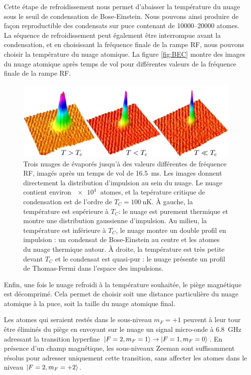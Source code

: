 Cette étape de refroidissement nous permet d'abaisser la température du nuage sous le seuil de condensation de Bose-Einstein.
Nous pouvons ainsi produire de façon reproductible des condensats sur puce contenant de \SIrange{10000}{20000}{} atomes.
La séquence de refroidissement peut également être interrompue avant la condensation, et en choisissant la fréquence finale de la rampe RF, nous pouvons choisir la température du nuage atomique.
La figure \eqref{fig:BEC} montre des images du nuage atomique après temps de vol pour différentes valeurs de la fréquence finale de la rampe RF.
%
\begin{figure}[!h]
\centering
\includegraphics[width=.8\linewidth]{figures/setup/coldatoms/BEC}
\caption[Condensat de Bose-Einstein sur puce]{
Trois nuages de  évaporés jusqu'à des valeurs différentes de fréquence RF, imagés après un temps de vol de \SI{16.5}{\ms}.
Les images donnent directement la distribution d'impulsion au sein du nuage.
Le nuage contient environ $\SI{e4}{}$ atomes, et la tepérature critique de condensation est de l'ordre de $T_C = \SI{100}{\nano\K}$.
\`A gauche, la température est supérieure à $T_C$: le nuage est purement thermique et montre une distribution gaussienne d'impulsion.
Au milieu, la température est inférieure à $T_C$, le nuage montre un double profil en impulsion : un condensat de Bose-Einstein au centre et les atomes du nuage thermique autour.
\`A droite, la température est très petite devant $T_C$ et le condensat est quasi-pur : le nuage présente un profil de Thomas-Fermi dans l'espace des impulsions.
}
\label{fig:BEC}
\end{figure}
%

Enfin, une fois le nuage refroidi à la température souhaitée, le piège magnétique est décomprimé.
Cela permet de choisir soit une distance particulière du nuage atomique à la puce, soit la taille du nuage atomique final.

Les atomes qui seraient restés dans le sous-niveau $m_F=+1$ peuvent à leur tour être éliminés du piège en envoyant sur le nuage un signal micro-onde à \SI{6.8}{\GHz} adressant la transition hyperfine $\ket{F=2,m_F=1} \rightarrow \ket{F=1,m_F=0}$.
En présence d'un champ magnétique, les sous-niveaux Zeeman sont suffisamment résolus pour adresser uniquement cette transition, sans affecter les atomes dans le niveau $\ket{F=2,m_F=+2}$.


